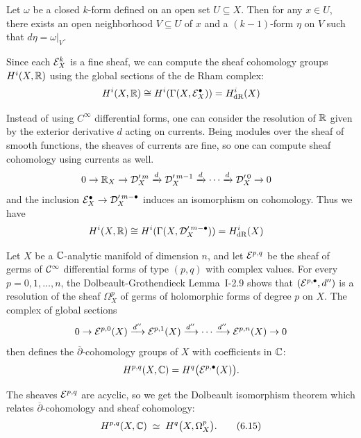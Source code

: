 \documentclass[12pt]{article}
\begin{document}
\begin{lemma}
    Let $\omega$ be a closed $k$-form defined on an open set $U \subseteq X$. Then for any $x \in U$, there exists an open neighborhood $V \subseteq U$ of $x$ and a $(k-1)$-form $\eta$ on $V$ such that $d\eta = \omega|_V$.
\end{lemma}

Since each ${\mathcal{E}}^k_X$ is a fine sheaf, we can compute the sheaf cohomology groups $H^i(X, \mathbb{R})$ using the global sections of the de Rham complex:
\[
H^i(X, \mathbb{R}) \cong H^i(\Gamma(X, {\mathcal{E}}^\bullet_X)) = H^i_{\text{dR}}(X)
\]

Instead of using $C^\infty$ differential forms, one can consider the resolution of $\mathbb{R}$ given by the exterior derivative $d$ acting on currents. Being modules over the sheaf of smooth functions, the sheaves of currents are fine, so one can compute sheaf cohomology using currents as well.
\begin{align*}
    0 \to \mathbb{R}_X & \to {\mathcal{D}}'^{\,m}_X \xrightarrow{d} {\mathcal{D}}'^{\,m-1}_X \xrightarrow{d} \cdots \xrightarrow{d} {\mathcal{D}}'^{\,0}_X \to 0
\end{align*} and the inclusion ${\mathcal{E}}_X^\bullet \to {\mathcal{D}}'^{\,m-\bullet}_X$ induces an isomorphism on cohomology.
Thus we have \begin{align*}
    H^i(X, \mathbb{R}) & \cong H^i(\Gamma(X, {\mathcal{D}}'^{\,m-\bullet}_X)) = H^i_{\text{dR}}(X)
\end{align*}


Let $X$ be a $\mathbb{C}$-analytic manifold of dimension $n$, and let
${\mathcal{E}}^{p,q}$ be the sheaf of germs of ${\mathcal{C}}^\infty$ differential forms of
type $(p,q)$ with complex values.
For every $p=0,1,\dots,n$, the Dolbeault-Grothendieck Lemma~I-2.9 shows
that $({\mathcal{E}}^{p,\bullet},d'')$ is a resolution of the sheaf $\Omega_X^p$ of
germs of holomorphic forms of degree $p$ on $X$.
The complex of global sections
\[0 \to {\mathcal{E}}^{p,0}(X) \xrightarrow{d''} {\mathcal{E}}^{p,1}(X) \xrightarrow{d''} \cdots \xrightarrow{d''} {\mathcal{E}}^{p,n}(X) \to 0\]
then defines the $\overline{\partial}$-cohomology groups of $X$ with
coefficients in $\mathbb{C}$:
\begin{equation}
  H^{p,q}(X,\mathbb{C}) = H^q\bigl({\mathcal{E}}^{p,\bullet}(X)\bigr).
\end{equation}

The sheaves ${\mathcal{E}}^{p,q}$ are acyclic, so we get the Dolbeault
isomorphism theorem which
relates $\overline{\partial}$-cohomology and sheaf cohomology:
\begin{equation}
  H^{p,q}(X,\mathbb{C}) \;\simeq\; H^q\bigl(X,\Omega_X^p\bigr).
  \tag{6.15}
\end{equation}
\end{document}
